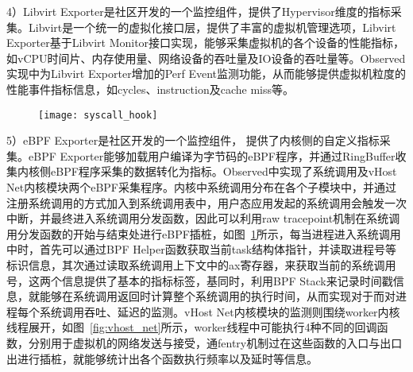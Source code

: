 4）Libvirt Exporter是社区开发的一个监控组件，提供了Hypervisor维度的指标采集。Libvirt是一个统一的虚拟化接口层，提供了丰富的虚拟机管理选项，Libvirt Exporter基于Libvirt Monitor接口实现，能够采集虚拟机的各个设备的性能指标，如vCPU时间片、内存使用量、网络设备的吞吐量及IO设备的吞吐量等。Observed实现中为Libvirt Exporter增加的Perf Event监测功能，从而能够提供虚拟机粒度的性能事件指标信息，如cycles、instruction及cache miss等。

\begin{figure}[!htbp]
    \centering
    \texttt{[image: syscall\_hook]}
    \label{fig:syscall_hook}
\end{figure}

5）eBPF Exporter是社区开发的一个监控组件， 提供了内核侧的自定义指标采集。eBPF Exporter能够加载用户编译为字节码的eBPF程序，并通过RingBuffer收集内核侧eBPF程序采集的数据转化为指标。Observed中实现了系统调用及vHost Net内核模块两个eBPF采集程序。内核中系统调用分布在各个子模块中，并通过注册系统调用的方式加入到系统调用表中，用户态应用发起的系统调用会触发一次中断，并最终进入系统调用分发函数，因此可以利用raw tracepoint机制在系统调用分发函数的开始与结束处进行eBPF插桩，如图~\ref{fig:syscall_hook}所示，每当进程进入系统调用中时，首先可以通过BPF Helper函数获取当前task结构体指针，并读取进程号等标识信息，其次通过读取系统调用上下文中的ax寄存器，来获取当前的系统调用号，这两个信息提供了基本的指标标签，基同时，利用BPF Stack来记录时间戳信息，就能够在系统调用返回时计算整个系统调用的执行时间，从而实现对于而对进程每个系统调用吞吐、延迟的监测。vHost Net内核模块的监测则围绕worker内核线程展开，如图~\ref{fig:vhost_net}所示，worker线程中可能执行4种不同的回调函数，分别用于虚拟机的网络发送与接受，通fentry机制过在这些函数的入口与出口出进行插桩，就能够统计出各个函数执行频率以及延时等信息。

